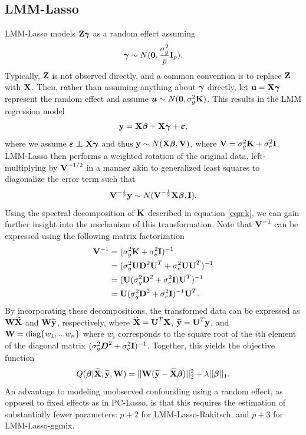 \subsection{LMM-Lasso}
LMM-Lasso models $\textbf{Z}\boldsymbol{\gamma}$ as a random effect assuming 
$$\boldsymbol{\gamma} \sim N(\boldsymbol{0}, \frac{\sigma^2_g}{p} \textbf{I}_p).$$  Typically, $\textbf{Z}$ is not observed directly, and a common convention \citep[e.g.,][]{Rakitsch2012} is to replace $\textbf{Z}$ with $\textbf{X}$. Then, rather than assuming anything about $\boldsymbol{\gamma}$ directly, let $\textbf{u}=\textbf{X}\boldsymbol{\gamma}$ represent the random effect and assume $\boldsymbol{u} \sim N(\boldsymbol{0}, \sigma^2_g \textbf{K})$. This results in the LMM regression model
\begin{equation}
    \label{eqn:lmm_reg}
    \textbf{y} = \textbf{X}\boldsymbol{\beta} + \textbf{X}\boldsymbol{\gamma}+ \boldsymbol{\varepsilon},
\end{equation}
where we assume $\beps \independent \bX\bgamma$ and thus $\textbf{y}  \sim N(\textbf{X} \boldsymbol{\beta}, \textbf{V})$, where $\textbf{V} = \sigma^2_g \textbf{K} + \sigma^2_e \textbf{I}$. LMM-Lasso then performs a weighted rotation of the original data, left-multiplying by $\textbf{V}^{-1/2}$ in a manner akin to generalized least squares to diagonalize the error term such that
\begin{equation}
\textbf{V}^{-\frac{1}{2}}\textbf{y} \sim N(\textbf{V}^{-\frac{1}{2}}\textbf{X} \boldsymbol{\beta}, \textbf{I}).
\end{equation}
Using the spectral decomposition of $\textbf{K}$ described in equation \ref{eqn:k}, we can gain further insight into the mechanism of this transformation. Note that $\textbf{V}^{-1}$ can be expressed using the following matrix factorization  
\begin{align*}
    \textbf{V}^{-1} &= (\sigma^2_g \textbf{K} + \sigma^2_e \textbf{I})^{-1}\\
    &=(\sigma^2_g \textbf{U} \textbf{D}^2 \textbf{U}^T + \sigma^2_e \textbf{U} \textbf{U}^T)^{-1}\\
    &= (\textbf{U} (\sigma^2_g \textbf{D}^2 + \sigma^2_e \textbf{I}) \textbf{U}^T)^{-1}\\
    &=\textbf{U} (\sigma^2_g \textbf{D}^2 + \sigma^2_e \textbf{I})^{-1} \textbf{U}^T.
\end{align*}
By incorporating these decompositions, the transformed data can be expressed as $\textbf{W} \widetilde{\textbf{X}}$ and $\textbf{W} \widetilde{\textbf{y}}$, respectively, where $\widetilde{\textbf{X}} = \textbf{U}^T \textbf{X}$, $\widetilde{\textbf{y}} = \textbf{U}^T \textbf{y}$, and $\textbf{W} = \text{diag}\{w_1, ... w_n\}$ where $w_i$ corresponds to the square root of the $i$th element of the diagonal matrix $(\sigma^2_g \boldsymbol{D}^2 + \sigma^2_e \textbf{I})^{-1}$. Together, this yields the objective function
\begin{equation}
\label{eqn:lmm_obj}
Q(\boldsymbol{\beta} | \widetilde{\textbf{X}}, \widetilde{\textbf{y}}, \textbf{W}) = || \textbf{W} (\widetilde{\textbf{y}} - \widetilde{\textbf{X}} \boldsymbol{\beta})||_2^2 + \lambda || \boldsymbol{\beta} ||_1.
\end{equation}
An advantage to modeling unobserved confounding using a random effect, as opposed to fixed effects as in PC-Lasso, is that this requires the estimation of substantially fewer parameters: $p + 2$ for LMM-Lasso-Rakitsch, and $p + 3$ for LMM-Lasso-ggmix. 


